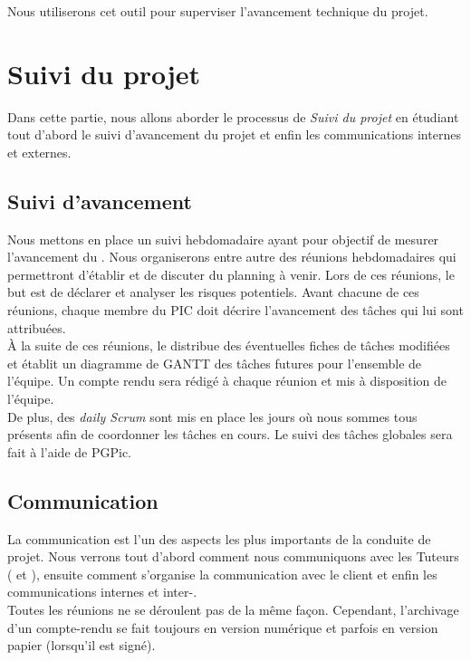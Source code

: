 Nous utiliserons cet outil pour superviser l'avancement technique du projet.

\section{Suivi du projet} 
\label{suivi_projet}

Dans cette partie, nous allons aborder le processus de \textit{Suivi du projet} en étudiant tout d'abord le suivi d'avancement du projet et enfin les communications internes et externes.  

\subsection{Suivi d'avancement}
\label{suivi_avancement}

Nous mettons en place un suivi hebdomadaire ayant pour objectif de mesurer l'avancement du \PICCourt. Nous organiserons entre autre des réunions hebdomadaires qui permettront d'établir et de discuter du planning à venir. Lors de ces réunions, le but est de déclarer et analyser les risques potentiels. Avant chacune de ces réunions, chaque membre du PIC doit décrire l'avancement des tâches qui lui sont attribuées.\\

À la suite de ces réunions, le \CP{} distribue des éventuelles fiches de tâches modifiées et établit un diagramme de GANTT des tâches futures pour l'ensemble de l'équipe. Un compte rendu sera rédigé à chaque réunion et mis à disposition de l'équipe. \\

De plus, des \textit{daily Scrum} sont mis en place les jours où nous sommes tous présents afin de coordonner les tâches en cours. Le suivi des tâches globales sera fait à l’aide de PGPic.

\subsection{Communication}
\label{communication}

La communication est l'un des aspects les plus importants de la conduite de projet. Nous verrons tout d'abord comment nous communiquons avec les Tuteurs (\tuteurPedagogique{} et \tuteurQualite), ensuite comment s'organise la communication avec le client et enfin les communications internes et inter-\PICCourt.\\ 

Toutes les réunions ne se déroulent pas de la même façon. Cependant, l’archivage d’un compte-rendu se fait toujours en version numérique et parfois en version papier (lorsqu’il est signé).

